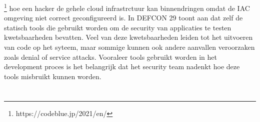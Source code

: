 \footnote{https://codeblue.jp/2021/en/} hoe een hacker de gehele cloud infrastrctuur kan binnendringen omdat de IAC omgeving niet correct geconfigureerd is. In DEFCON 29 toont \textcite{Bar2021} aan dat zelf de statisch tools die gebruikt worden om de security van applicaties te testen kwetsbaarheden bevatten. Veel van deze kwetsbaarheden leiden tot het uitvoeren van code op het syteem, maar sommige kunnen ook andere aanvallen veroorzaken zoals denial of service attacks. Vooraleer tools gebruikt worden in het development proces is het belangrijk dat het security team nadenkt hoe deze tools misbruikt kunnen worden. 

\section{}%
\label{sec:Beveiligingsmaatregelen om secrets te beschermen}

